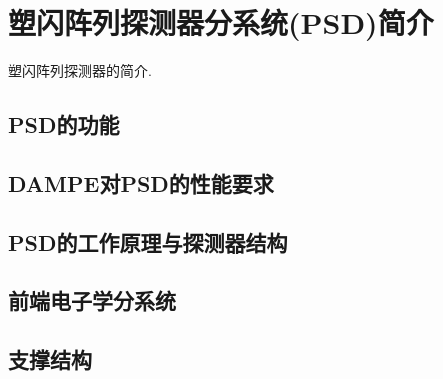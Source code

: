 \chapter{塑闪阵列探测器分系统(PSD)简介}
塑闪阵列探测器的简介.
\section{PSD的功能}

\section{DAMPE对PSD的性能要求}
\section{PSD的工作原理与探测器结构}

\section{前端电子学分系统}

\section{支撑结构}